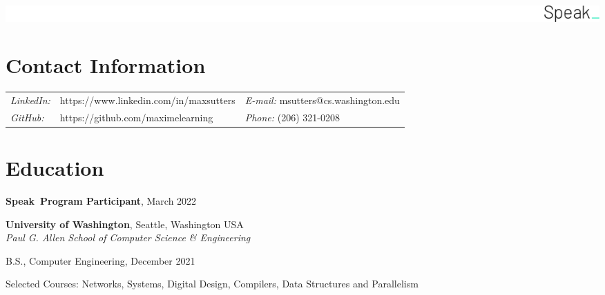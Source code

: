 \documentclass[margin,line]{res}
\newenvironment{list1}{
  \begin{list}{\ding{113}}{%
      \setlength{\itemsep}{0in}
      \setlength{\parsep}{0in} \setlength{\parskip}{0in}
      \setlength{\topsep}{0in} \setlength{\partopsep}{0in} 
      \setlength{\leftmargin}{0.17in}}}{\end{list}}
\begin{document}
\thispagestyle{empty}

\includegraphics[scale=0.08]{Speak Logo 1500}

\begin{resume}
\section{\sc Contact Information}
\vspace{.05in}
\begin{tabular}{@{}p{0.5in}p{2.5in}p{3in}}
{\it LinkedIn:} & https://www.linkedin.com/in/maxsutters & {\it E-mail:}  msutters@cs.washington.edu \\   
{\it GitHub:} & https://github.com/maximelearning & {\it Phone:} (206) 321-0208
\\   
\end{tabular}


\vspace{-.2cm}
\section{\sc Education}

{\bf Speak\textunderscore \ Program Participant}, March 2022\\
\vspace*{-.6cm}

{\bf University of Washington}, Seattle, Washington USA\\
{\em Paul G. Allen School of Computer Science \& Engineering} 
\vspace*{.1cm}
\begin{list1}
\item[] B.S., Computer Engineering, December 2021
\item[] Selected Courses: Networks, Systems, Digital Design, Compilers, Data Structures and Parallelism
\end{list1}


\end{resume}
\end{document}

